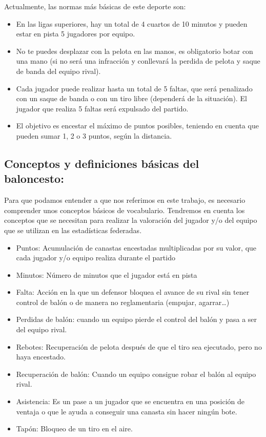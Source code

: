 \documentclass[
]{article}
\providecommand{\tightlist}{%
  \setlength{\itemsep}{0pt}\setlength{\parskip}{0pt}}
\begin{document}
Actualmente, las normas más básicas de este deporte son:

\begin{itemize}
\tightlist
\item
  En las ligas superiores, hay un total de 4 cuartos de 10 minutos y
  pueden estar en pista 5 jugadores por equipo.
\item
  No te puedes desplazar con la pelota en las manos, es obligatorio
  botar con una mano (si no será una infracción y conllevará la perdida
  de pelota y saque de banda del equipo rival).
\item
  Cada jugador puede realizar hasta un total de 5 faltas, que será
  penalizado con un saque de banda o con un tiro libre (dependerá de la
  situación). El jugador que realiza 5 faltas será expulsado del
  partido.
\item
  El objetivo es encestar el máximo de puntos posibles, teniendo en
  cuenta que pueden sumar 1, 2 o 3 puntos, según la distancia.
\end{itemize}

\hypertarget{conceptos-y-definiciones-buxe1sicas-del-baloncesto}{%
\subsection{Conceptos y definiciones básicas del
baloncesto:}\label{conceptos-y-definiciones-buxe1sicas-del-baloncesto}}

Para que podamos entender a que nos referimos en este trabajo, es
necesario comprender unos conceptos básicos de vocabulario. Tendremos en
cuenta los conceptos que se necesitan para realizar la valoración del
jugador y/o del equipo que se utilizan en las estadísticas federadas.

\begin{itemize}
\tightlist
\item
  Puntos: Acumulación de canastas encestadas multiplicadas por su valor,
  que cada jugador y/o equipo realiza durante el partido
\item
  Minutos: Número de minutos que el jugador está en pista
\item
  Falta: Acción en la que un defensor bloquea el avance de su rival sin
  tener control de balón o de manera no reglamentaria (empujar,
  agarrar\ldots)
\item
  Perdidas de balón: cuando un equipo pierde el control del balón y pasa
  a ser del equipo rival.
\item
  Rebotes: Recuperación de pelota después de que el tiro sea ejecutado,
  pero no haya encestado.
\item
  Recuperación de balón: Cuando un equipo consigue robar el balón al
  equipo rival.
\item
  Asistencia: Es un pase a un jugador que se encuentra en una posición
  de ventaja o que le ayuda a conseguir una canasta sin hacer ningún
  bote.
\item
  Tapón: Bloqueo de un tiro en el aire.
\end{itemize}
\end{document}
